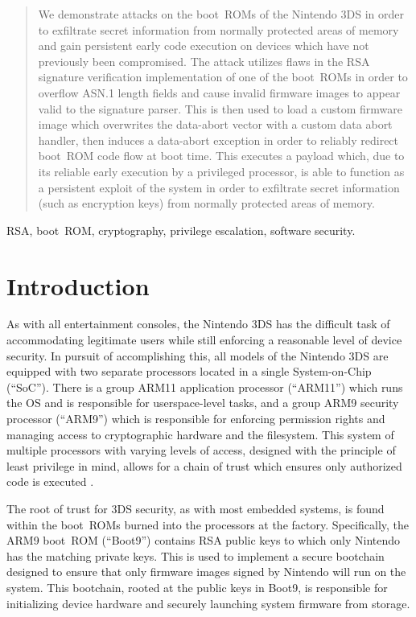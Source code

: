 \documentclass[journal]{IEEEtran}
\begin{document}
\begin{abstract}
We demonstrate attacks on the boot~ROMs of the Nintendo 3DS in order to
exfiltrate secret information from normally protected areas of memory and gain
persistent early code execution on devices which have not previously been
compromised. The attack utilizes flaws in the RSA signature verification
implementation of one of the boot~ROMs in order to overflow ASN.1 length fields
and cause invalid firmware images to appear valid to the signature parser. This
is then used to load a custom firmware image which overwrites the data-abort
vector with a custom data abort handler, then induces a data-abort exception in
order to reliably redirect boot~ROM code flow at boot time. This executes a
payload which, due to its reliable early execution by a privileged processor, is
able to function as a persistent exploit of the system in order to exfiltrate
secret information (such as encryption keys) from normally protected areas of
memory.
\end{abstract}

\begin{IEEEkeywords}
RSA, boot~ROM, cryptography, privilege escalation, software security.
\end{IEEEkeywords}

\section{Introduction}

As with all entertainment consoles, the Nintendo 3DS has the difficult task of
accommodating legitimate users while still enforcing a reasonable level of
device security. In pursuit of accomplishing this, all models of the Nintendo
3DS are equipped with two separate processors located in a single System-on-Chip
(``SoC''). There is a group ARM11 application processor (``ARM11'') which runs
the OS and is responsible for userspace-level tasks, and a group ARM9 security
processor (``ARM9'') which is responsible for enforcing permission rights and
managing access to cryptographic hardware and the filesystem. This system of
multiple processors with varying levels of access, designed with the principle
of least privilege in mind, allows for a chain of trust which ensures only
authorized code is executed \cite{cryptosystem}.

The root of trust for 3DS security, as with most embedded systems, is found
within the boot~ROMs burned into the processors at the factory. Specifically,
the ARM9 boot~ROM (``Boot9'') contains RSA public keys to which only Nintendo
has the matching private keys. This is used to implement a secure bootchain
designed to ensure that only firmware images signed by Nintendo will run on the
system. This bootchain, rooted at the public keys in Boot9, is responsible for
initializing device hardware and securely launching system firmware from
storage\cite{bootloader}.
\end{document}
